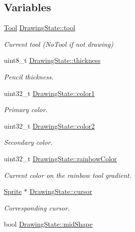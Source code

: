 \subsection*{Variables}
\begin{DoxyCompactItemize}
\item 
\mbox{\hyperlink{group__game__state_ga8cdac3f25ed2be17d210ff50defe0791}{Tool}} \mbox{\hyperlink{group__game__state_ga1e98afd819bebaa1b6bd24c689d870a7}{Drawing\+State\+::tool}}
\begin{DoxyCompactList}\small\item\em Current tool (No\+Tool if not drawing) \end{DoxyCompactList}\item 
uint8\+\_\+t \mbox{\hyperlink{group__game__state_ga10ed53265f325368bdc3bea0fd0f7e92}{Drawing\+State\+::thickness}}
\begin{DoxyCompactList}\small\item\em Pencil thickness. \end{DoxyCompactList}\item 
uint32\+\_\+t \mbox{\hyperlink{group__game__state_gaad6324a79966f9966c4f45b6f8db1439}{Drawing\+State\+::color1}}
\begin{DoxyCompactList}\small\item\em Primary color. \end{DoxyCompactList}\item 
uint32\+\_\+t \mbox{\hyperlink{group__game__state_ga2b3f5a1ab34c67d534cb90afa8caf6dd}{Drawing\+State\+::color2}}
\begin{DoxyCompactList}\small\item\em Secondary color. \end{DoxyCompactList}\item 
uint32\+\_\+t \mbox{\hyperlink{group__game__state_ga77b100fecc69cfce99634262258a2510}{Drawing\+State\+::rainbow\+Color}}
\begin{DoxyCompactList}\small\item\em Current color on the rainbow tool gradient. \end{DoxyCompactList}\item 
\mbox{\hyperlink{struct_sprite}{Sprite}} $\ast$ \mbox{\hyperlink{group__game__state_gaf04f059f3cb2049366c3ef91d0ea4ce9}{Drawing\+State\+::cursor}}
\begin{DoxyCompactList}\small\item\em Corresponding cursor. \end{DoxyCompactList}\item 
bool \mbox{\hyperlink{group__game__state_ga62e90a0c5f0cacba70d03d78d1bb3393}{Drawing\+State\+::mid\+Shape}}

\end{DoxyCompactItemize}

